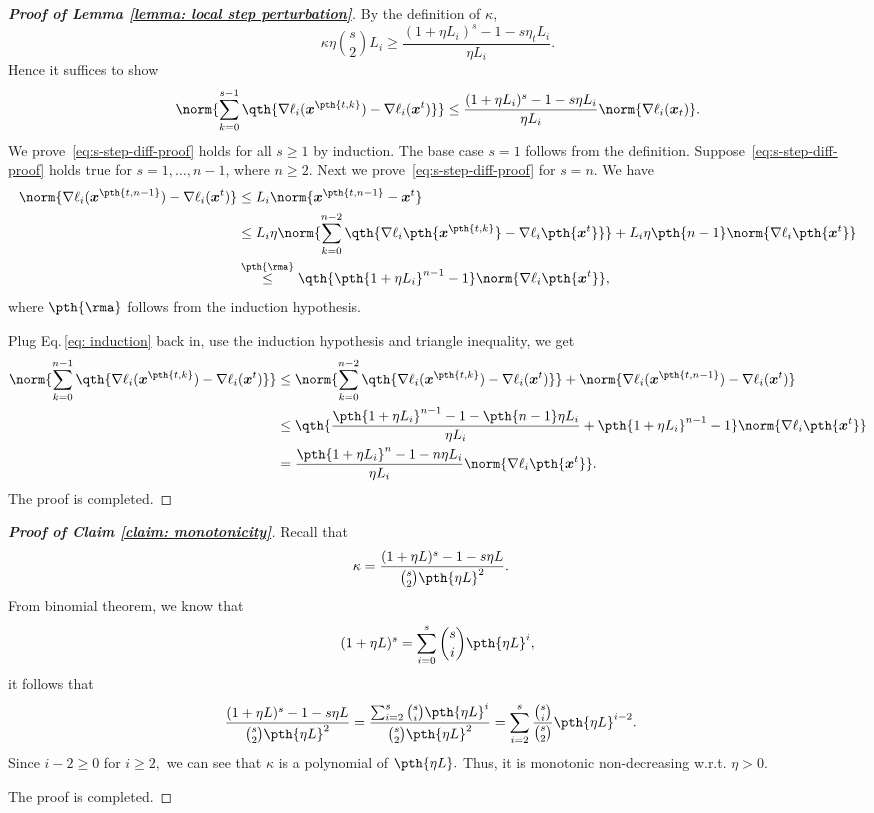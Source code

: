 \documentclass[letterpaper, 10 pt, conference]{ieeeconf}  %
\newcommand{\x}{{\bm x}}
\begin{document}
\begin{proof}[\bf Proof of Lemma \ref{lemma: local step perturbation}]
By the definition of $\kappa$,
$$
\kappa \eta\binom{s}{2} L_i
\ge \frac{(1+\eta L_i)^s - 1- s \eta_t L_i}{\eta L_i}.
$$
Hence it suffices to show 
\begin{equation}
\label{eq:s-step-diff-proof}
\norm{\sum_{k=0}^{s-1}\qth{ \nabla \ell_i (\x^{\pth{t,k}}) - \nabla \ell_i (\x^t)}}
\le \frac{(1+\eta L_i)^s - 1- s \eta L_i}{\eta L_i} \norm{\nabla \ell_{i}(\x_t)}.
\end{equation}
We prove~\eqref{eq:s-step-diff-proof} holds for all $s\ge 1$ by induction.
The base case $s=1$ follows from the definition.
Suppose~\eqref{eq:s-step-diff-proof} holds true for $s=1,\dots,n-1$, where $n\ge 2$.
Next we prove~\eqref{eq:s-step-diff-proof} for $s = n$.
We have
\begin{align}
 \norm{ \nabla \ell_i (\x^{\pth{t,n-1}}) - \nabla \ell_i (\x^t)}
 &\le L_i \norm{\x^{\pth{t,n-1}} - \x^t}\nonumber\\
 &\le L_i \eta \norm{\sum_{k=0}^{n-2}\qth{\nabla \ell_i \pth{\x^{\pth{t,k}}}-\nabla \ell_i \pth{\x^{t}}}} + L_i \eta \pth{n-1} \norm{\nabla \ell_i\pth{\x^t}}\nonumber\\
 &\overset{\pth{\rma}}{\le} \qth{\pth{1+\eta L_i}^{n-1} - 1}\norm{\nabla \ell_i\pth{\x^t}}, \label{eq: induction}
\end{align}
where $\pth{\rma}$ follows from the induction hypothesis.

Plug Eq.\,\eqref{eq: induction} back in, use the induction hypothesis and triangle inequality, we get
\begin{align*}
\norm{\sum_{k=0}^{n-1}\qth{ \nabla \ell_i (\x^{\pth{t,k}}) - \nabla \ell_i (\x^t)}}
&\le  \norm{\sum_{k=0}^{n-2}\qth{ \nabla \ell_i (\x^{\pth{t,k}}) - \nabla \ell_i (\x^t)}} + \norm{ \nabla \ell_i (\x^{\pth{t,n-1}}) - \nabla \ell_i (\x^t)}\\
& \le \qth{\frac{\pth{1+\eta L_i}^{n-1} - 1 - \pth{n-1}\eta L_i}{\eta L_i} + \pth{1+\eta L_i}^{n-1} - 1}\norm{\nabla \ell_i\pth{\x^t}}\\
& = \frac{\pth{1+\eta L_i}^{n} - 1 - n \eta L_i}{\eta L_i}\norm{\nabla \ell_i\pth{\x^t}}.
\end{align*}
The proof is completed.
\end{proof}
\begin{proof}[\bf Proof of Claim \ref{claim: monotonicity}]
Recall that 
\begin{align*}
\kappa &= \frac{(1+\eta L)^s - 1- s \eta L}{\binom{s}{2}\pth{\eta L}^2}.
\end{align*}
From binomial theorem, we know that
\[
(1+\eta L)^s = \sum_{i=0}^s \binom{s}{i} \pth{\eta L}^i,
\]
it follows that
\begin{align*}
\frac{(1+\eta L)^s - 1- s \eta L }{\binom{s}{2}\pth{\eta L}^2}&= \frac{\sum_{i=2}^s \binom{s}{i} \pth{\eta L}^i}{\binom{s}{2}\pth{\eta L}^2}
= \sum_{i=2}^s \frac{\binom{s}{i}}{\binom{s}{2}} \pth{\eta L}^{i-2}.
\end{align*}
Since $i-2\ge 0$ for $i\ge 2,$ we can see that $\kappa$ is a polynomial of $\pth{\eta L}.$ 
Thus, it is monotonic non-decreasing w.r.t. $\eta>0.$

The proof is completed.
\end{proof}
\end{document}
